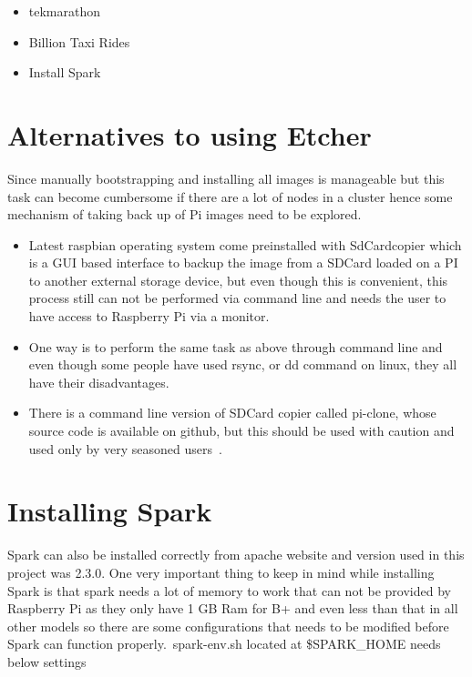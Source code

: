 \begin{itemize}
\item tekmarathon~\cite{hid-sp18-510-pisetup-1}
\item Billion Taxi Rides~\cite{hid-sp18-510-pisetup-2}
\item Install Spark~\cite{hid-sp18-510-pisetup-3}
\end{itemize}

\section{Alternatives to using Etcher}

Since manually bootstrapping and installing all images is manageable
but this task can become cumbersome if there are a lot of nodes in a
cluster hence some mechanism of taking back up of Pi images need to be
explored.

\begin{itemize}
\item Latest raspbian operating system come preinstalled with
  SdCardcopier which is a GUI based interface to backup the image from
  a SDCard loaded on a PI to another external storage device, but even
  though this is convenient, this process still can not be performed
  via command line and needs the user to have access to Raspberry Pi
  via a monitor.
\item One way is to perform the same task as above through command
  line and even though some people have used rsync, or dd command on
  linux, they all have their disadvantages.
\item There is a command line version of SDCard copier called
  pi-clone, whose source code is available on github, but this should
  be used with caution and used only by very seasoned
  users~\cite{hid-sp18-510-git}.
\end{itemize}

\section{Installing Spark}

Spark can also be installed correctly from apache website and version
used in this project was 2.3.0. One very important thing to keep in
mind while installing Spark is that spark needs a lot of memory to
work that can not be provided by Raspberry Pi as they only have 1 GB
Ram for B+ and even less than that in all other models so there are
some configurations that needs to be modified before Spark can
function properly.~spark-env.sh located at \$SPARK\_HOME needs below
settings

